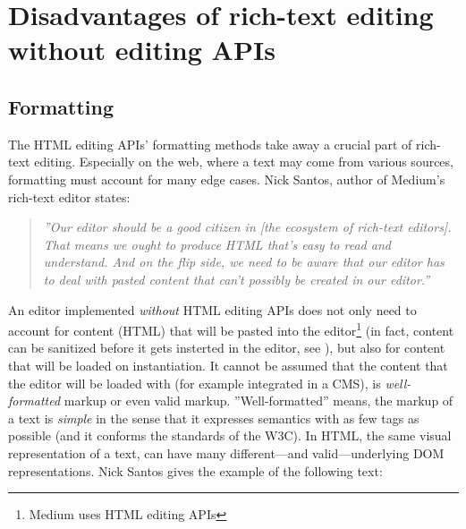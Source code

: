 
\section{Disadvantages of rich-text editing without editing APIs}

\subsection{Formatting}
\label{subsec:noapi_dis_formatting}
The HTML editing APIs' formatting methods take away a crucial part of rich-text editing. Especially on the web, where a text may come from various sources, formatting must account for many edge cases. Nick Santos, author of Medium's rich-text editor states:

\begin{quotation}
\textit{''Our editor should be a good citizen in [the ecosystem of rich-text editors]. That means we ought to produce HTML that's easy to read and understand. And on the flip side, we need to be aware that our editor has to deal with pasted content that can't possibly be created in our editor.\cite{so_paste_plain}''}
\end{quotation}


An editor implemented \textit{without} HTML editing APIs does not only need to account for content (HTML) that will be pasted into the editor\footnote{Medium uses HTML editing APIs} (in fact, content can be sanitized before it gets insterted in the editor, see ), but also for content that will be loaded on instantiation. It cannot be assumed that the content that the editor will be loaded with (for example integrated in a CMS), is \textit{well-formatted} markup or even valid markup. ''Well-formatted'' means, the markup of a text is \textit{simple} in the sense that it expresses semantics with as few tags as possible (and it conforms the standards  of the W3C). In HTML, the same visual representation of a text, can have many different---and valid---underlying DOM representations. Nick Santos gives the example of the following text\cite{so_paste_plain}:



